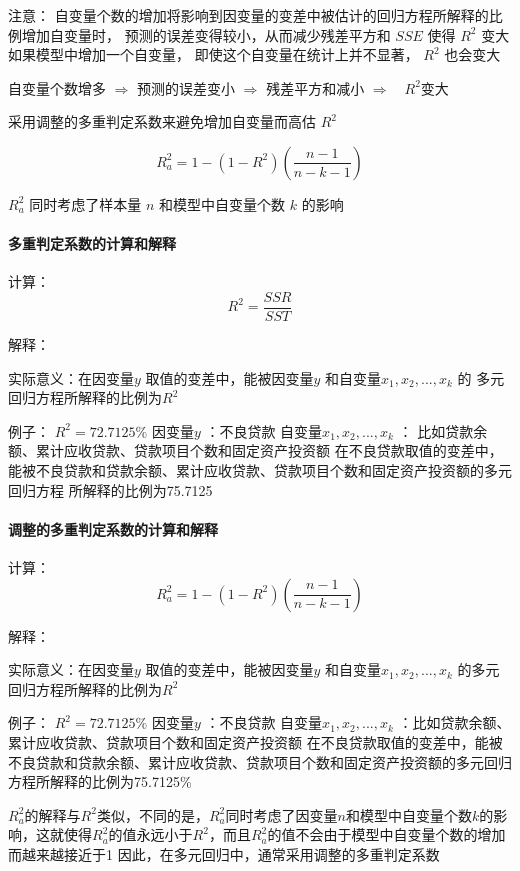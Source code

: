\documentclass[UTF8,10pt]{book}
\begin{document}
注意： 自变量个数的增加将影响到因变量的变差中被估计的回归方程所解释的比例增加自变量时，
预测的误差变得较小，从而减少残差平方和 $SSE$ 
使得 $R^2$ 变大如果模型中增加一个自变量，
即使这个自变量在统计上并不显著， $R^2$ 也会变大 

自变量个数增多 $\Rightarrow$ 预测的误差变小 $\Rightarrow$ 残差平方和减小 $\Rightarrow \quad R^2$变大 

采用调整的多重判定系数来避免增加自变量而高估 $R^2$ 

$$ R_a^2 =1-(1-R^2)(\frac{n-1}{n-k-1}) $$ 

$R_a^2$ 同时考虑了样本量 $ n$ 和模型中自变量个数 $k$ 的影响

\paragraph{多重判定系数的计算和解释}

计算： 
$$ R^2 = \frac{SSR}{SST} $$ 

解释： 

实际意义：在因变量$y$ 取值的变差中，能被因变量$y$ 和自变量$x_1,x_2,...,x_k$ 的
多元回归方程所解释的比例为$R^2$ 

例子： $R^2=72.7125\% $ 因变量$y$ ：不良贷款 自变量$x_1,x_2,...,x_k$ ：
比如贷款余额、累计应收贷款、贷款项目个数和固定资产投资额 在不良贷款取值的变差中，
能被不良贷款和贷款余额、累计应收贷款、贷款项目个数和固定资产投资额的多元回归方程
所解释的比例为75.7125%

\paragraph{调整的多重判定系数的计算和解释}	

计算： 
$$ R_a^2 =1-(1-R^2)(\frac{n-1}{n-k-1}) $$ 

解释： 

实际意义：在因变量$y$ 取值的变差中，能被因变量$y$ 和自变量$x_1,x_2,...,x_k$ 的多元回归方程所解释的比例为$R^2$ 

例子： $R^2=72.7125\% $ 因变量$y$ ：不良贷款 自变量$x_1,x_2,...,x_k$ ：比如贷款余额、累计应收贷款、贷款项目个数和固定资产投资额 在不良贷款取值的变差中，能被不良贷款和贷款余额、累计应收贷款、贷款项目个数和固定资产投资额的多元回归方程所解释的比例为75.7125\% 

$R_a^2$的解释与$R^2$类似，不同的是，$R_a^2$同时考虑了因变量$n$和模型中自变量个数$k$的影响，这就使得$R_a^2$的值永远小于$R^2$，而且$R_a^2$的值不会由于模型中自变量个数的增加而越来越接近于1 因此，在多元回归中，通常采用调整的多重判定系数
\end{document}
